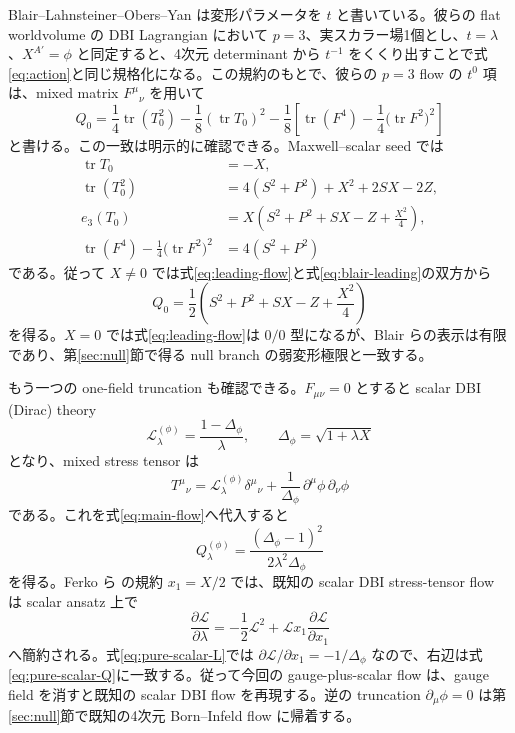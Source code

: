 \documentclass[a4paper,11pt]{ltjsarticle}
\numberwithin{equation}{section}
\newcommand{\tr}{\operatorname{tr}}
\newcommand{\Lag}{\mathcal L}
\begin{document}
Blair--Lahnsteiner--Obers--Yan は変形パラメータを $t$ と書いている\cite{Blair2025}。彼らの flat worldvolume の DBI Lagrangian において $p=3$、実スカラー場1個とし、$t=\lambda$、$X^{A'}=\phi$ と同定すると、4次元 determinant から $t^{-1}$ をくくり出すことで式\eqref{eq:action}と同じ規格化になる。この規約のもとで、彼らの $p=3$ flow の $t^0$ 項は、mixed matrix $F^\mu{}_{\nu}$ を用いて
\begin{equation}
 Q_0
 =\frac14\tr(T_0^2)-\frac18(\tr T_0)^2
 -\frac18\left[\tr(F^4)-\frac14\bigl(\tr F^2\bigr)^2\right]
 \label{eq:blair-leading}
\end{equation}
と書ける。この一致は明示的に確認できる。Maxwell--scalar seed では
\begin{align}
 \tr T_0&=-X,\nonumber\\
 \tr(T_0^2)&=4(S^2+P^2)+X^2+2SX-2Z,\nonumber\\
 e_3(T_0)&=X\left(S^2+P^2+SX-Z+\frac{X^2}{4}\right),\nonumber\\
 \tr(F^4)-\frac14\bigl(\tr F^2\bigr)^2&=4(S^2+P^2)
 \label{eq:seed-identities}
\end{align}
である。従って $X\neq0$ では式\eqref{eq:leading-flow}と式\eqref{eq:blair-leading}の双方から
\begin{equation}
 Q_0=\frac12\left(S^2+P^2+SX-Z+\frac{X^2}{4}\right)
 \label{eq:leading-flow-fields}
\end{equation}
を得る。$X=0$ では式\eqref{eq:leading-flow}は $0/0$ 型になるが、Blair らの表示は有限であり、第\ref{sec:null}節で得る null branch の弱変形極限と一致する。

もう一つの one-field truncation も確認できる。$F_{\mu\nu}=0$ とすると scalar DBI (Dirac) theory
\begin{equation}
 \Lag_\lambda^{(\phi)}=\frac{1-\Delta_\phi}{\lambda},
 \qquad
 \Delta_\phi=\sqrt{1+\lambda X}
 \label{eq:pure-scalar-L}
\end{equation}
となり、mixed stress tensor は
\begin{equation}
 T^\mu{}_{\nu}=\Lag_\lambda^{(\phi)}\delta^\mu{}_{\nu}
 +\frac{1}{\Delta_\phi}\,\partial^\mu\phi\,\partial_\nu\phi
 \label{eq:pure-scalar-T}
\end{equation}
である。これを式\eqref{eq:main-flow}へ代入すると
\begin{equation}
 Q_\lambda^{(\phi)}=\frac{(\Delta_\phi-1)^2}{2\lambda^2\Delta_\phi}
 \label{eq:pure-scalar-Q}
\end{equation}
を得る。Ferko ら\cite{Ferko2024DBI} の規約 $x_1=X/2$ では、既知の scalar DBI stress-tensor flow は scalar ansatz 上で
\begin{equation}
 \frac{\partial\Lag}{\partial\lambda}
 =-\frac12\Lag^2+\Lag x_1\frac{\partial\Lag}{\partial x_1}
 \label{eq:ferko-scalar-flow}
\end{equation}
へ簡約される。式\eqref{eq:pure-scalar-L}では $\partial\Lag/\partial x_1=-1/\Delta_\phi$ なので、右辺は式\eqref{eq:pure-scalar-Q}に一致する。従って今回の gauge-plus-scalar flow は、gauge field を消すと既知の scalar DBI flow を再現する。逆の truncation $\partial_\mu\phi=0$ は第\ref{sec:null}節で既知の4次元 Born--Infeld flow に帰着する。
\end{document}

